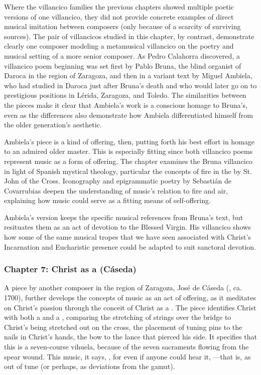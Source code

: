 \documentclass[tt]{vcbook-proposal}
\begin{document}
Where the villancico families the previous chapters showed multiple poetic versions of one villancico, they did not provide concrete examples of direct musical imitation between composers (only because of a scarcity of surviving sources).
The pair of villancicos studied in this chapter, by contrast, demonstrate clearly one composer modeling a metamusical villancico on the poetry and musical setting of a more senior composer.
As Pedro Calahorra discovered, a villancico poem beginning  was set first by Pablo Bruna, the blind organist of Daroca in the region of Zaragoza, and then in a variant text by Miguel Ambiela, who had studied in Daroca just after Bruna's death and who would later go on to prestigious positions in Lérida, Zaragoza, and Toledo.
The similarities between the pieces make it clear that Ambiela's work is a conscious homage to Bruna's, even as the differences also demonstrate how Ambiela differentiated himself from the older generation's aesthetic. 

Ambiela's piece is a kind of offering, then, putting forth his best effort in homage to an admired older master.
This is especially fitting since both villancico poems represent music as a form of offering.
The chapter examines the Bruna villancico in light of Spanish mystical theology, particular the concepts of fire in the  by St. John of the Cross.
Iconography and epigrammatic poetry by Sebastián de Covarrubias deepen the understanding of music's relation to fire and air, explaining how music could serve as a fitting means of self-offering.

Ambiela's version keeps the specific musical references from Bruna's text, but resituates them as an act of devotion to the Blessed Virgin.
His villancico shows how some of the same musical tropes that we have seen associated with Christ's Incarnation and Eucharistic presence could be adapted to suit sanctoral devotion. 

\subsubsection{Chapter 7: Christ as a  (Cáseda)}

A piece by another composer in the region of Zaragoza, José de Cáseda (, ca. 1700), further develops the concepts of music as an act of offering, as it meditates on Christ's passion through the conceit of Christ as a . 
The piece identifies Christ with both a  and a , comparing the stretching of strings over the bridge to Christ's being stretched out on the cross, the placement of tuning pins to the nails in Christ's hands, the bow to the lance that pierced his side.
It specifies that this is a seven-course vihuela, because of the seven sacraments flowing from the spear wound.
This music, it says, , for even if anyone could hear it, ---that is, as out of tune (or perhaps, as  deviations from the gamut). 
\end{document}
